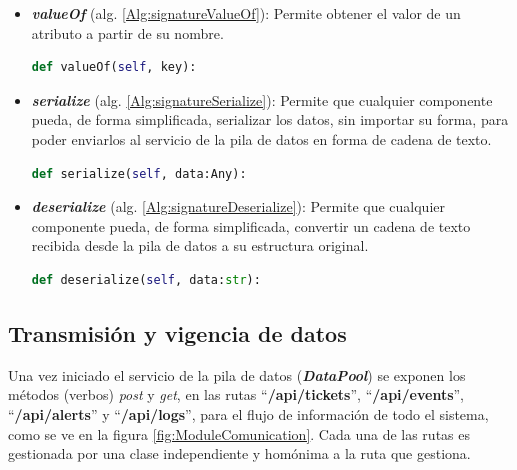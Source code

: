     \begin{itemize}
                \item \textbf{\textit{valueOf}} (alg. \ref{Alg:signatureValueOf}): Permite obtener el valor de un atributo a partir de su nombre.
                \begin{lstlisting}[language=Python, caption={Firma del método "\textit{valueOf}" de la clase Data.}, label=Alg:signatureValueOf, numbers=none]
def valueOf(self, key):
                \end{lstlisting}

                \item \textbf{\textit{serialize}} (alg. \ref{Alg:signatureSerialize}): Permite que cualquier componente pueda, de forma simplificada, serializar los datos, sin importar su forma, para poder enviarlos al servicio de la pila de datos en forma de cadena de texto.
                \begin{lstlisting}[language=Python, caption={Firma del método "\textit{serialize}" de la clase Data.}, label=Alg:signatureSerialize, numbers=none]
def serialize(self, data:Any):
                \end{lstlisting}
                
                \item \textbf{\textit{deserialize}} (alg. \ref{Alg:signatureDeserialize}): Permite que cualquier componente pueda, de forma simplificada, convertir un cadena de texto recibida desde la pila de datos a su estructura original.
                \begin{lstlisting}[language=Python, caption={Firma del método "\textit{deserialize}" de la clase Data.}, label=Alg:signatureDeserialize, numbers=none]
def deserialize(self, data:str):
                \end{lstlisting}
    \end{itemize}
    
    \subsection{Transmisión y vigencia de datos}
    \label{sub:Pool}
        Una vez iniciado el servicio de la pila de datos (\textbf{\textit{DataPool}}) se exponen los métodos (verbos) \textit{post} y \textit{get}, en las rutas ``\textbf{/api/tickets}'', ``\textbf{/api/events}'', ``\textbf{/api/alerts}'' y ``\textbf{/api/logs}'', para el flujo de información de todo el sistema, como se ve en la figura \ref{fig:ModuleComunication}. Cada una de las rutas es gestionada por una clase independiente y homónima a la ruta que gestiona.
        
